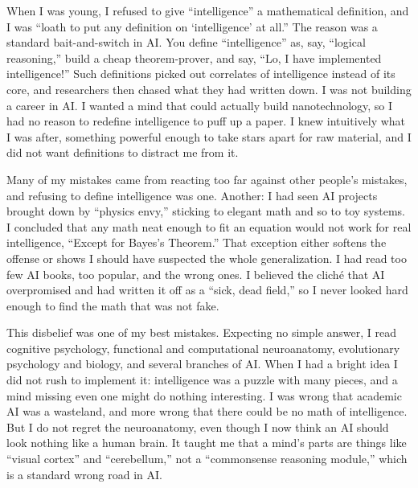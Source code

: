 
When I was young, I refused to give ``intelligence'' a mathematical definition, and I was ``loath to put any definition on `intelligence' at all.'' The reason was a standard bait-and-switch in AI. You define ``intelligence'' as, say, ``logical reasoning,'' build a cheap theorem-prover, and say, ``Lo, I have implemented intelligence!'' Such definitions picked out correlates of intelligence instead of its core, and researchers then chased what they had written down. I was not building a career in AI. I wanted a mind that could actually build nanotechnology, so I had no reason to redefine intelligence to puff up a paper. I knew intuitively what I was after, something powerful enough to take stars apart for raw material, and I did not want definitions to distract me from it. 

Many of my mistakes came from reacting too far against other people's mistakes, and refusing to define intelligence was one. Another: I had seen AI projects brought down by ``physics envy,'' sticking to elegant math and so to toy systems. I concluded that any math neat enough to fit an equation would not work for real intelligence, ``Except for Bayes's Theorem.'' That exception either softens the offense or shows I should have suspected the whole generalization. I had read too few AI books, too popular, and the wrong ones. I believed the cliché that AI overpromised and had written it off as a ``sick, dead field,'' so I never looked hard enough to find the math that was not fake. 

This disbelief was one of my best mistakes. Expecting no simple answer, I read cognitive psychology, functional and computational neuroanatomy, evolutionary psychology and biology, and several branches of AI. When I had a bright idea I did not rush to implement it: intelligence was a puzzle with many pieces, and a mind missing even one might do nothing interesting. I was wrong that academic AI was a wasteland, and more wrong that there could be no math of intelligence. But I do not regret the neuroanatomy, even though I now think an AI should look nothing like a human brain. It taught me that a mind's parts are things like ``visual cortex'' and ``cerebellum,'' not a ``commonsense reasoning module,'' which is a standard wrong road in AI.

